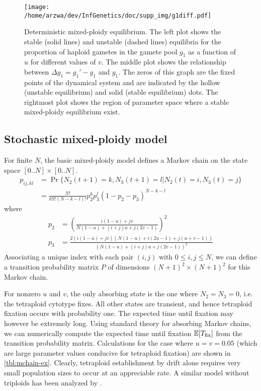 \documentclass[11pt,a4paper]{article}
\begin{document}
\begin{figure}
\centering
\texttt{[image: /home/arzwa/dev/InfGenetics/doc/supp\_img/g1diff.pdf]}
\caption{
Deterministic mixed-ploidy equilibrium. The left plot shows the stable (solid
lines) and unstable (dashed lines) equilibria for the proportion of haploid
gametes in the gamete pool $g_1$ as a function of $u$ for different values of
$v$. The middle plot shows the relationship between $\Delta g_1 = g_1' - g_1$
and $g_1$. The zeros of this graph are the fixed points of the dynamical system
and are indicated by the hollow (unstable equilibrium) and solid (stable
equilibrium) dots. The rightmost plot shows the region of parameter space where
a stable mixed-ploidy equilibrium exist.
\label{fig:g1diff}}
\end{figure}

\subsection{Stochastic mixed-ploidy model \label{sec:mchain}}

For finite $N$, the basic mixed-ploidy model defines a Markov chain on the
state space $[0..N] \times [0..N]$.
\begin{align}
  p_{ij,kl} &= \Pr\{N_2(t+1)=k, N_3(t+1)=l | N_2(t)=i, N_3(t)=j\} \nonumber \\
    &= \frac{N!}{k!l!(N-k-l)!} p_2^k p_3^l (1-p_2-p_3)^{N-k-l}
\end{align}
where 
\begin{align}
  p_2 &= \left(\frac{i(1-u) + jv}{N(1-u) + (i+j)u + j(2v-1)}\right)^2 \\
  p_3 &= \frac{2(i(1-u) + jv)(N(1-u) + i(2u - 1) + j(u + v - 1))}
    {\left(N(1-u) + (i+j)u + j(2v-1)\right)^2} 
\end{align}
Associating a unique index with each pair $(i,j)$ with $0 \le i,j \le N$, we
can define a transition probability matrix $P$ of dimensions $(N+1)^2 \times
(N+1)^2$ for this Markov chain.

For nonzero $u$ and $v$, the only absorbing state is the one where $N_2 = N_3 =
0$, i.e. the tetraploid cytotype fixes.
All other states are transient, and hence tetraploid fixation occurs with
probability one.
The expected time until fixation may however be extremely long.
Using standard theory for absorbing Markov chains, we can numerically compute
the expected time until fixation $\mathbb{E}[T_{\text{fix}}]$ from the transition
probability matrix.
Calculations for the case where $u=v=0.05$ (which are large parameter values
conducive for tetraploid fixation) are shown in \cref{tbl:mchain-ex}.  Clearly,
tetraploid establishment by drift alone requires very small population sizes to
occur at an appreciable rate.
A similar model without triploids has been analyzed by \cite{rausch2005}.
\end{document}
